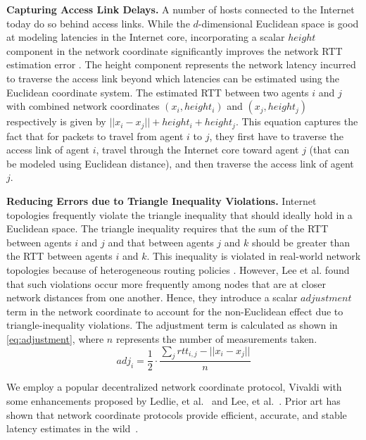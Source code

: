 \par \noindent \textbf{Capturing Access Link Delays. } A number of hosts connected to the Internet today do so behind access links. While the $d$-dimensional Euclidean space is good at modeling latencies in the Internet core, incorporating a scalar $height$ component in the network coordinate significantly improves the network RTT estimation error \cite{vivaldi}. The height component represents the network latency incurred to traverse the access link beyond which latencies can be estimated using the Euclidean coordinate system. The estimated RTT between two agents $i$ and $j$ with combined network coordinates $\left( x_i, height_i \right)$ and $\left( x_j, height_j \right)$ respectively is given by $|| x_i - x_j || + height_i + height_j$. This equation captures the fact that for packets to travel from agent $i$ to $j$, they first have to traverse the access link of agent $i$, travel through the Internet core toward agent $j$ (that can be modeled using Euclidean distance), and then traverse the access link of agent $j$. 

\par \noindent \textbf{Reducing Errors due to Triangle Inequality Violations. } Internet topologies frequently violate the triangle inequality that should ideally hold in a Euclidean space. The triangle inequality requires that the sum of the RTT between agents $i$ and $j$ and that between agents $j$ and $k$ should be greater than the RTT between agents $i$ and $k$. This inequality is violated in real-world network topologies because of heterogeneous routing policies \cite{zheng2005internet}. However, Lee et al. \cite{lee2009suitability} found that such violations occur more frequently  among nodes that are at closer network distances from one another. Hence, they introduce a scalar $adjustment$ term in the network coordinate to account for the non-Euclidean effect due to triangle-inequality violations. The adjustment term is calculated as shown in \cref{eq:adjustment}, where $n$ represents the number of measurements taken.
\begin{equation}
adj_i = \dfrac{1}{2} \cdot \dfrac{\sum_{j} rtt_{i,j} - || x_i - x_j ||}{n}
\label{eq:adjustment}
\end{equation}

\par We employ a popular decentralized network coordinate protocol, Vivaldi \cite{vivaldi} with some enhancements proposed by Ledlie, et al.~\cite{ledlie2007network} and Lee, et al.~\cite{lee2009suitability}. Prior art has shown that network coordinate protocols provide efficient, accurate, and stable latency estimates in the wild~\cite{ledlie2007network}.

